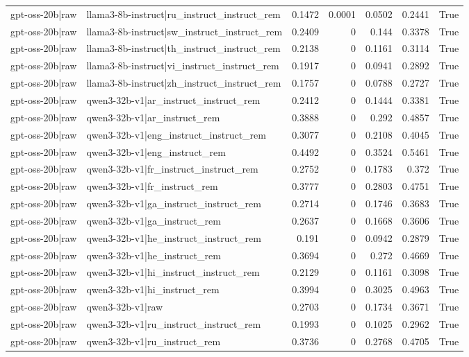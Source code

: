 \begin{table}
\begin{tabular}{l l r r r r l}
gpt-oss-20b|raw & llama3-8b-instruct|ru_instruct_instruct_rem & 0.1472 & 0.0001 & 0.0502 & 0.2441 & True \\
gpt-oss-20b|raw & llama3-8b-instruct|sw_instruct_instruct_rem & 0.2409 & 0 & 0.144 & 0.3378 & True \\
gpt-oss-20b|raw & llama3-8b-instruct|th_instruct_instruct_rem & 0.2138 & 0 & 0.1161 & 0.3114 & True \\
gpt-oss-20b|raw & llama3-8b-instruct|vi_instruct_instruct_rem & 0.1917 & 0 & 0.0941 & 0.2892 & True \\
gpt-oss-20b|raw & llama3-8b-instruct|zh_instruct_instruct_rem & 0.1757 & 0 & 0.0788 & 0.2727 & True \\
gpt-oss-20b|raw & qwen3-32b-v1|ar_instruct_instruct_rem & 0.2412 & 0 & 0.1444 & 0.3381 & True \\
gpt-oss-20b|raw & qwen3-32b-v1|ar_instruct_rem & 0.3888 & 0 & 0.292 & 0.4857 & True \\
gpt-oss-20b|raw & qwen3-32b-v1|eng_instruct_instruct_rem & 0.3077 & 0 & 0.2108 & 0.4045 & True \\
gpt-oss-20b|raw & qwen3-32b-v1|eng_instruct_rem & 0.4492 & 0 & 0.3524 & 0.5461 & True \\
gpt-oss-20b|raw & qwen3-32b-v1|fr_instruct_instruct_rem & 0.2752 & 0 & 0.1783 & 0.372 & True \\
gpt-oss-20b|raw & qwen3-32b-v1|fr_instruct_rem & 0.3777 & 0 & 0.2803 & 0.4751 & True \\
gpt-oss-20b|raw & qwen3-32b-v1|ga_instruct_instruct_rem & 0.2714 & 0 & 0.1746 & 0.3683 & True \\
gpt-oss-20b|raw & qwen3-32b-v1|ga_instruct_rem & 0.2637 & 0 & 0.1668 & 0.3606 & True \\
gpt-oss-20b|raw & qwen3-32b-v1|he_instruct_instruct_rem & 0.191 & 0 & 0.0942 & 0.2879 & True \\
gpt-oss-20b|raw & qwen3-32b-v1|he_instruct_rem & 0.3694 & 0 & 0.272 & 0.4669 & True \\
gpt-oss-20b|raw & qwen3-32b-v1|hi_instruct_instruct_rem & 0.2129 & 0 & 0.1161 & 0.3098 & True \\
gpt-oss-20b|raw & qwen3-32b-v1|hi_instruct_rem & 0.3994 & 0 & 0.3025 & 0.4963 & True \\
gpt-oss-20b|raw & qwen3-32b-v1|raw & 0.2703 & 0 & 0.1734 & 0.3671 & True \\
gpt-oss-20b|raw & qwen3-32b-v1|ru_instruct_instruct_rem & 0.1993 & 0 & 0.1025 & 0.2962 & True \\
gpt-oss-20b|raw & qwen3-32b-v1|ru_instruct_rem & 0.3736 & 0 & 0.2768 & 0.4705 & True \\

\end{tabular}
\end{table}
